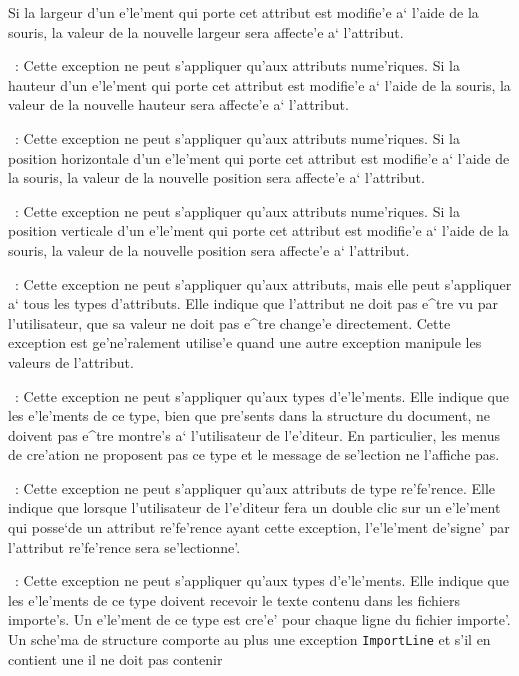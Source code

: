 {\begin{description}
 Si la largeur d'un e'le'ment qui porte cet attribut est modifie'e a`
 l'aide de la souris, la valeur de la nouvelle largeur sera affecte'e a`
 l'attribut.
\item[{\tt NewHeight}]~:
 Cette exception ne peut s'appliquer qu'aux attributs nume'riques.
 Si la hauteur d'un e'le'ment qui porte cet attribut est modifie'e a`
 l'aide de la souris, la valeur de la nouvelle hauteur sera affecte'e a`
 l'attribut.
\item[{\tt NewHPos}]~:
 Cette exception ne peut s'appliquer qu'aux attributs nume'riques.
 Si la position horizontale d'un e'le'ment qui porte cet attribut est
 modifie'e a` l'aide de la souris, la valeur de la nouvelle position sera
 affecte'e a` l'attribut.
\item[{\tt NewVPos}]~:
 Cette exception ne peut s'appliquer qu'aux attributs nume'riques.
 Si la position verticale d'un e'le'ment qui porte cet attribut est
 modifie'e a` l'aide de la souris, la valeur de la nouvelle position sera
 affecte'e a` l'attribut.
\item[{\tt Invisible}]~:
 Cette exception ne peut s'appliquer qu'aux attributs, mais elle peut
 s'appliquer a` tous les types d'attributs. Elle indique que l'attribut
 ne doit pas e^tre vu par l'utilisateur, que sa valeur ne doit pas e^tre
 change'e directement. Cette exception est ge'ne'ralement utilise'e quand
 une autre exception manipule les valeurs de l'attribut.
\item[{\tt Hidden}]~:
 Cette exception ne peut s'appliquer qu'aux types d'e'le'ments. Elle indique
 que les e'le'ments de ce type, bien que pre'sents dans la structure du
 document, ne doivent pas e^tre montre's a` l'utilisateur de l'e'diteur.
 En particulier, les menus de cre'ation ne proposent pas ce type et le
 message de se'lection ne l'affiche pas.
\item[{\tt ActiveRef}]~:
 Cette exception ne peut s'appliquer qu'aux attributs de type re'fe'rence.
 Elle indique que lorsque l'utilisateur de l'e'diteur fera un double clic
 sur un e'le'ment qui posse`de un attribut re'fe'rence ayant cette exception,
 l'e'le'ment de'signe' par l'attribut re'fe'rence sera se'lectionne'.
\item[{\tt ImportLine}]~:
 Cette exception ne peut s'appliquer qu'aux types d'e'le'ments. Elle indique
 que les e'le'ments de ce type doivent recevoir le texte contenu dans les
 fichiers importe's.  Un e'le'ment de ce type est cre'e' pour chaque ligne
 du fichier importe'. Un sche'ma de structure comporte au plus une
 exception {\tt ImportLine} et s'il en contient une il ne doit pas contenir

\end{description}}
